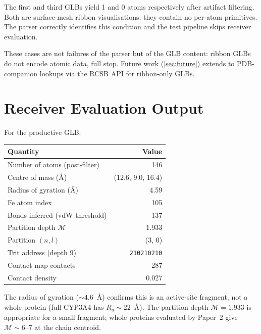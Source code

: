 \documentclass[11pt,twocolumn,a4paper]{article}
\theoremstyle{definition}
\theoremstyle{remark}
\newcommand{\depth}{\mathcal{M}}
\begin{document}
The first and third GLBs yield 1 and 0 atoms respectively after
artifact filtering. Both are surface-mesh ribbon visualisations; they
contain no per-atom primitives. The parser correctly identifies this
condition and the test pipeline skips receiver evaluation.

These cases are not failures of the parser but of the GLB content:
ribbon GLBs do not encode atomic data, full stop. Future work
(\cref{sec:future}) extends to PDB-companion lookups via the RCSB API
for ribbon-only GLBs.

\section{Receiver Evaluation Output}
\label{sec:receiver_output}

For the productive GLB:

\begin{center}
\small
\begin{tabular}{lr}
\toprule
\textbf{Quantity} & \textbf{Value} \\
\midrule
Number of atoms (post-filter) & 146 \\
Centre of mass (\AA) & (12.6, 9.0, 16.4) \\
Radius of gyration (\AA) & 4.59 \\
Fe atom index & 105 \\
Bonds inferred (vdW threshold) & 137 \\
Partition depth $\depth$ & 1.933 \\
Partition $(n, l)$ & (3, 0) \\
Trit address (depth 9) & \texttt{210210210} \\
Contact map contacts & 287 \\
Contact density & 0.027 \\
\bottomrule
\end{tabular}
\end{center}

The radius of gyration ($\sim 4.6$~\AA) confirms this is an active-site
fragment, not a whole protein (full CYP3A4 has $R_g \sim 22$~\AA). The
partition depth $\depth = 1.933$ is appropriate for a small fragment;
whole proteins evaluated by Paper~2 give $\depth \sim 6$--$7$ at the
chain centroid.
\end{document}
